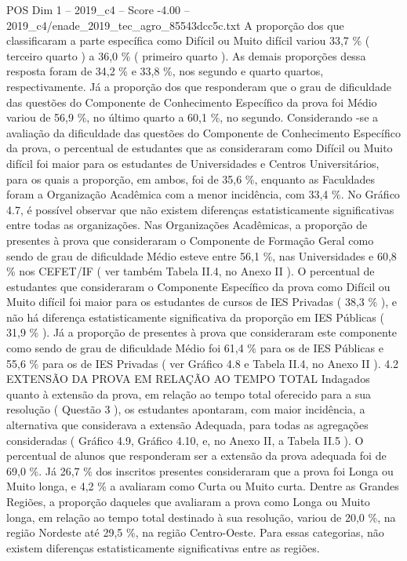 \begin{textsample}{POS Dim 1 – 2019\_c4 – Score -4.00 – 2019\_c4/enade\_2019\_tec\_agro\_85543dcc5c.txt}
A proporção dos que classificaram a parte específica como Difícil ou Muito difícil variou 33,7 \% ( terceiro quarto ) a 36,0 \% ( primeiro quarto ).
As demais proporções dessa resposta foram de 34,2 \% e 33,8 \%, nos segundo e quarto quartos, respectivamente.
Já a proporção dos que responderam que o grau de dificuldade das questões do Componente de Conhecimento Específico da prova foi Médio variou de 56,9 \%, no último quarto a 60,1 \%, no segundo.
Considerando -se a avaliação da dificuldade das questões do Componente de Conhecimento Específico da prova, o percentual de estudantes que as consideraram como Difícil ou Muito difícil foi maior para os estudantes de Universidades e Centros Universitários, para os quais a proporção, em ambos, foi de 35,6 \%, enquanto as Faculdades foram a Organização Acadêmica com a menor incidência, com 33,4 \%.
No Gráfico 4.7, é possível observar que não existem diferenças estatisticamente significativas entre todas as organizações.
Nas Organizações Acadêmicas, a proporção de presentes à prova que consideraram o Componente de Formação Geral como sendo de grau de dificuldade Médio esteve entre 56,1 \%, nas Universidades e 60,8 \% nos CEFET/IF ( ver também Tabela II.4, no Anexo II ).
O percentual de estudantes que consideraram o Componente Específico da prova como Difícil ou Muito difícil foi maior para os estudantes de cursos de IES Privadas ( 38,3 \% ), e não há diferença estatisticamente significativa da proporção em IES Públicas ( 31,9 \% ).
Já a proporção de presentes à prova que consideraram este componente como sendo de grau de dificuldade Médio foi 61,4 \% para os de IES Públicas e 55,6 \% para os de IES Privadas ( ver Gráfico 4.8 e Tabela II.4, no Anexo II ). 4.2 EXTENSÃO DA PROVA EM RELAÇÃO AO TEMPO TOTAL Indagados quanto à extensão da prova, em relação ao tempo total oferecido para a sua resolução ( Questão 3 ), os estudantes apontaram, com maior incidência, a alternativa que considerava a extensão Adequada, para todas as agregações consideradas ( Gráfico 4.9, Gráfico 4.10, e, no Anexo II, a Tabela II.5 ).
O percentual de alunos que responderam ser a extensão da prova adequada foi de 69,0 \%.
Já 26,7 \% dos inscritos presentes consideraram que a prova foi Longa ou Muito longa, e 4,2 \% a avaliaram como Curta ou Muito curta.
Dentre as Grandes Regiões, a proporção daqueles que avaliaram a prova como Longa ou Muito longa, em relação ao tempo total destinado à sua resolução, variou de 20,0 \%, na região Nordeste até 29,5 \%, na região Centro-Oeste.
Para essas categorias, não existem diferenças estatisticamente significativas entre as regiões.

\end{textsample}
